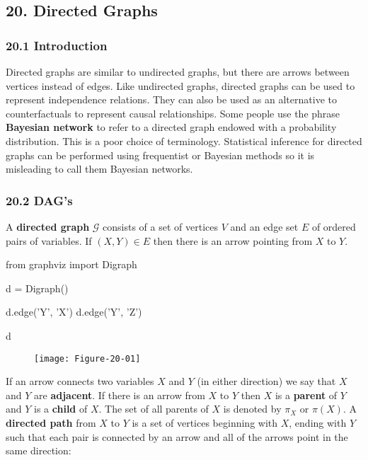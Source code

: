\subsection{20. Directed Graphs}\label{directed-graphs}

\subsubsection{20.1 Introduction}\label{introduction}

Directed graphs are similar to undirected graphs, but there are arrows
between vertices instead of edges. Like undirected graphs, directed
graphs can be used to represent independence relations. They can also be
used as an alternative to counterfactuals to represent causal
relationships. Some people use the phrase \textbf{Bayesian network} to
refer to a directed graph endowed with a probability distribution. This
is a poor choice of terminology. Statistical inference for directed
graphs can be performed using frequentist or Bayesian methods so it is
misleading to call them Bayesian networks.

\subsubsection{20.2 DAG's}\label{dags}

A \textbf{directed graph} \(\mathcal{G}\) consists of a set of vertices
\(V\) and an edge set \(E\) of ordered pairs of variables. If
\((X, Y) \in E\) then there is an arrow pointing from \(X\) to \(Y\).

\begin{python}
from graphviz import Digraph

d = Digraph()

d.edge('Y', 'X')
d.edge('Y', 'Z')

d
\end{python}

\begin{figure}[H]
\texttt{[image: Figure-20-01]}
\end{figure}

If an arrow connects two variables \(X\) and \(Y\) (in either direction)
we say that \(X\) and \(Y\) are \textbf{adjacent}. If there is an arrow
from \(X\) to \(Y\) then \(X\) is a \textbf{parent} of \(Y\) and \(Y\)
is a \textbf{child} of \(X\). The set of all parents of \(X\) is denoted
by \(\pi_X\) or \(\pi(X)\). A \textbf{directed path} from \(X\) to \(Y\)
is a set of vertices beginning with \(X\), ending with \(Y\) such that
each pair is connected by an arrow and all of the arrows point in the
same direction:

